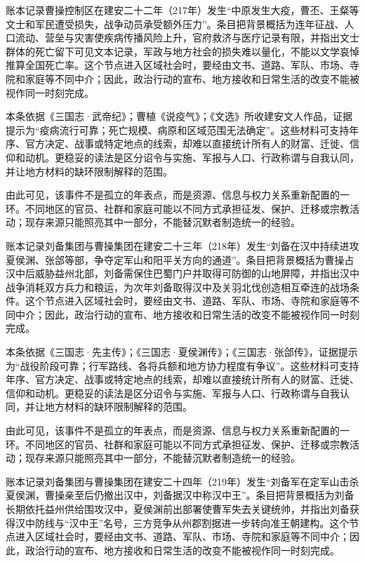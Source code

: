 账本记录曹操控制区在建安二十二年（217年）发生“中原发生大疫，曹丕、王粲等文士和军民遭受损失，战争动员承受额外压力”。条目把背景概括为连年征战、人口流动、营垒与灾害使疾病传播风险上升，官府救济与医疗记录有限，并指出文士群体的死亡留下可见文本记录，军政与地方社会的损失难以量化，不能以文学哀悼推算全国死亡率。这个节点进入区域社会时，要经由文书、道路、军队、市场、寺院和家庭等不同中介；因此，政治行动的宣布、地方接收和日常生活的改变不能被视作同一时刻完成。

本条依据《三国志·武帝纪》；曹植《说疫气》；《文选》所收建安文人作品，证据提示为“疫病流行可靠；死亡规模、病原和区域范围无法确定”。这些材料可支持年序、官方决定、战事或特定地点的线索，却难以直接统计所有人的财富、迁徙、信仰和动机。更稳妥的读法是区分诏令与实施、军报与人口、行政称谓与自我认同，并让地方材料的缺环限制解释的范围。

由此可见，该事件不是孤立的年表点，而是资源、信息与权力关系重新配置的一环。不同地区的官员、社群和家庭可能以不同方式承担征发、保护、迁移或宗教活动；现存来源只能照亮其中一部分，不能替沉默者制造统一的经验。

账本记录刘备集团与曹操集团在建安二十三年（218年）发生“刘备在汉中持续进攻夏侯渊、张郃等部，争夺定军山和阳平关方向的通道”。条目把背景概括为曹操占汉中后威胁益州北部，刘备需保住巴蜀门户并取得可防御的山地屏障，并指出汉中战争消耗双方兵力和粮运，为次年刘备取得汉中及关羽北伐创造相互牵连的战场条件。这个节点进入区域社会时，要经由文书、道路、军队、市场、寺院和家庭等不同中介；因此，政治行动的宣布、地方接收和日常生活的改变不能被视作同一时刻完成。

本条依据《三国志·先主传》；《三国志·夏侯渊传》；《三国志·张郃传》，证据提示为“战役阶段可靠；行军路线、各将兵额和地方协力程度有争议”。这些材料可支持年序、官方决定、战事或特定地点的线索，却难以直接统计所有人的财富、迁徙、信仰和动机。更稳妥的读法是区分诏令与实施、军报与人口、行政称谓与自我认同，并让地方材料的缺环限制解释的范围。

由此可见，该事件不是孤立的年表点，而是资源、信息与权力关系重新配置的一环。不同地区的官员、社群和家庭可能以不同方式承担征发、保护、迁移或宗教活动；现存来源只能照亮其中一部分，不能替沉默者制造统一的经验。

账本记录刘备集团与曹操集团在建安二十四年（219年）发生“刘备军在定军山击杀夏侯渊，曹操亲至后仍撤出汉中，刘备据汉中称汉中王”。条目把背景概括为刘备长期依托益州供给围攻汉中，夏侯渊前出部署使曹军失去关键统帅，并指出刘备获得汉中防线与“汉中王”名号，三方竞争从州郡割据进一步转向准王朝建构。这个节点进入区域社会时，要经由文书、道路、军队、市场、寺院和家庭等不同中介；因此，政治行动的宣布、地方接收和日常生活的改变不能被视作同一时刻完成。

